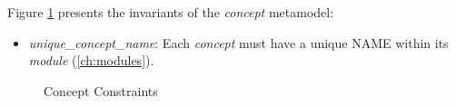 Figure \ref{fig:ocl:concept} presents the invariants of the \emph{concept} metamodel:

\begin{itemize}

\item \emph{unique\_concept\_name}:
Each \emph{concept} must have a unique NAME within its \emph{module} (\ref{ch:modules}).

\end{itemize}

\begin{figure}

\caption{Concept Constraints}
\label{fig:ocl:concept}
\end{figure}
